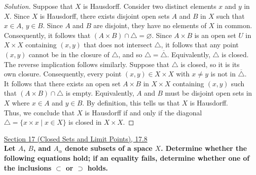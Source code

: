 \documentclass[11pt]{article}
\newenvironment{solution}
  {\renewcommand\qedsymbol{$\blacksquare$}\begin{proof}[Solution]}
  {\end{proof}}
\begin{document}
\begin{solution}
Suppose that $X$ is Hausdorff. Consider two distinct elements $x$ and $y$ in $X$. Since $X$ is Hausdorff, there exists 
disjoint open sets $A$ and $B$ in $X$ such that $x \in A$, $y \in B$. Since $A$ and $B$ are disjoint, they have no elements of $X$ in common. Consequently, it follows that $(A \times B) \cap \triangle = \varnothing$.
Since $A \times B$ is an open set $U$ in $X \times X$ containing $(x, y)$ that does not intersect $\triangle$, it follows that any point $(x, y)$ cannot be in the closure of $\triangle$, and so 
$\triangle = \overline{\triangle}$. Equivalently, $\triangle$ is closed. \\

The reverse implication follows similarly. Suppose that $\triangle$ is closed, so it is its own closure. Consequently, every point $(x, y) \in X \times X$ with $x \neq y$ is not in $\overline{\triangle}$.
It follows that there exists an open set $A \times B$ in $X \times X$ containing $(x, y)$ such that $(A \times B) \cap \triangle$ is empty. Equivalently, $A$ and $B$ must be disjoint open sets in $X$ where $x \in A$ and $y \in B$.
By definition, this tells us that $X$ is Hausdorff. \\

Thus, we conclude that $X$ is Hausdorff if and only if the diagonal $\triangle = \{ x \times x \mid x \in X \}$ is closed in $X \times X$. 
\end{solution}
\newpage

\underline{Section 17 (Closed Sets and Limit Points), 17.8} \\

\textbf{Let $A$, $B$, and $A_\alpha$ denote subsets of a space $X$. Determine whether the following equations hold; if an equality fails, determine whether
one of the inclusions $\subset$ or $\supset$ holds.}
\end{document}
